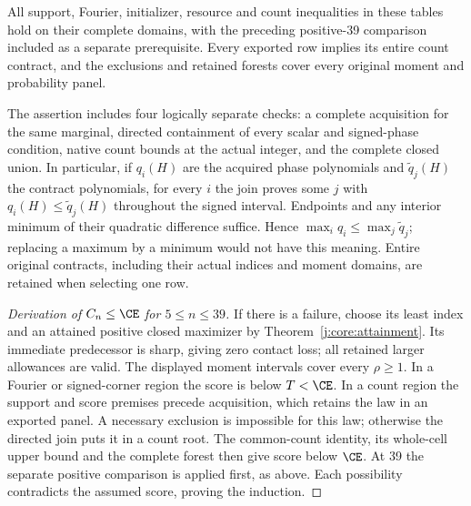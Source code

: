 \begin{proposition}
\label{j:finite:numerical539}
All support, Fourier, initializer, resource and count inequalities in
these tables hold on their complete domains, with the preceding
positive-39 comparison included as a separate prerequisite.
Every exported row implies its entire count contract, and the exclusions
and retained forests cover every original moment and probability panel.
\end{proposition}
The assertion includes four logically separate checks: a complete
acquisition for the same marginal, directed containment of every scalar
and signed-phase condition, native count bounds at the actual integer,
and the complete closed union. In particular, if $q_i(H)$ are the
acquired phase polynomials and $\widetilde q_j(H)$ the contract
polynomials, for every $i$ the join proves some $j$ with
$q_i(H)\le\widetilde q_j(H)$ throughout the signed interval. Endpoints
and any interior minimum of their quadratic difference suffice. Hence
$\max_iq_i\le\max_j\widetilde q_j$; replacing a maximum by a minimum
would not have this meaning. Entire original contracts, including their
actual indices and moment domains, are retained when selecting one row.

\begin{proof}[Derivation of $C_n\le\CE$ for $5\le n\le39$]
If there is a failure, choose its least index and an attained positive
closed maximizer by Theorem~\ref{j:core:attainment}. Its immediate
predecessor is sharp, giving zero contact loss; all retained larger
allowances are valid. The displayed moment intervals cover every
$\rho\ge1$. In a Fourier or signed-corner region the score is below
$T<\CE$. In a count region the support and score premises precede
acquisition, which retains the law in an exported panel. A necessary
exclusion is impossible for this law; otherwise the directed join puts
it in a count root. The common-count identity, its whole-cell upper
bound and the complete forest then give score below $\CE$.
At 39 the separate positive comparison is applied first, as above.
Each possibility contradicts the assumed score, proving the induction.
\end{proof}


